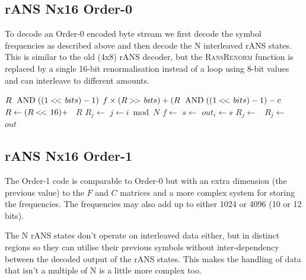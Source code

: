 \documentclass[a4paper]{article}
\begin{document}
\subsection{rANS Nx16 Order-0}

To decode an Order-0 encoded byte stream we first decode the symbol
frequencies as described above and then decode the N interleaved rANS
states.  This is similar to the old (4x8) rANS decoder, but the
\textsc{RansRenorm} function is replaced by a single 16-bit
renormalisation instead of a loop using 8-bit values and can
interleave to different amounts.

\begin{algorithmic}[1]
  \State \Return $R\ \bitand ((1 \shiftl bits) -1)$
\EndFunction
\Statex
{}
  \State \Return $f \times (R \shiftr bits) + (R\ \bitand ((1 \shiftl bits) -1) - c$
\EndFunction
\Statex
{}
    \State $R \gets (R \mathbin{<\mkern-3mu<\,} 16) +$\ 
  \EndIf
  \State \Return $R$
\EndFunction
\Statex
{}
  \State {}
    \State $R_j \gets$ 
  \EndFor
    \State $j \gets i \bmod N$
    \State $f \gets$ 
    \State $s \gets$ 
    \State $out_i \gets s$
    \State $R_j \gets$\ 
    \State $R_j \gets$\ 
  \EndFor
  \State \Return $out$
\EndFunction
\end{algorithmic}

\subsection{rANS Nx16 Order-1}

The Order-1 code is comparable to Order-0 but with an extra dimension
(the previous value) to the $F$ and $C$ matrices and a more complex
system for storing the frequencies.  The frequencies may also add up
to either 1024 or 4096 (10 or 12 bits).

The N rANS states don't operate on interleaved data either, but in
distinct regions so they can utilise their previous symbols without
inter-dependency between the decoded output of the rANS states.
This makes the handling of data that isn't a multiple of N is a little
more complex too.
\end{document}
